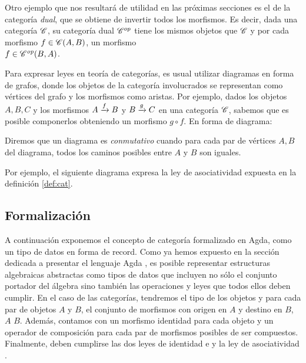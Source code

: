 \begin{example} \label{ex:op}
Otro ejemplo que nos resultará de utilidad en las próximas secciones es el de la categoría {\it dual}, que se obtiene de invertir todos los morfismos. Es decir, dada una categoría $\C$, su categoría dual $\C^{op}$ tiene los mismos objetos que $\C$ y por cada morfismo $f \in \Hom{A}{B}{\C}$, un morfismo\\ $f \in \Hom{B}{A}{\C^{op}}$.
\end{example}

\hspace{1ex}
Para expresar leyes en teoría de categorías, es usual utilizar diagramas en forma de grafos, donde los objetos de la categoría involucrados se representan como vértices del grafo y los morfismos como aristas. Por ejemplo, dados los objetos $A,B,C$ y los morfismos $\flecha{A}{f}{B}$ y $\flecha{B}{g}{C}$ en una categoría $\C$, sabemos que es posible componerlos obteniendo un morfismo $g \circ f$. En forma de diagrama:

  \begin{center}
  \xymatrixcolsep{3pc} \xymatrixrowsep{3pc}
  \centerline{}
  \end{center}

  Diremos que un diagrama es {\it conmutativo} cuando para cada par de vértices $A, B$ del diagrama, todos los caminos posibles entre $A$ y $B$ son iguales.

  Por ejemplo, el siguiente diagrama expresa la ley de asociatividad expuesta en la definición \ref{def:cat}.

  \begin{center}
  \xymatrixcolsep{3pc} \xymatrixrowsep{3pc}
  \centerline{}
  \end{center}

\subsection{Formalización}
A continuación exponemos el concepto de categoría formalizado en Agda, como un tipo de datos en forma de record.  
Como ya hemos expuesto en la sección dedicada a presentar el lenguaje Agda%
, es posible representar estructuras algebraicas abstractas como tipos de datos que incluyen no sólo el conjunto portador del álgebra sino también las operaciones y leyes que todos ellos deben cumplir. En el caso de las categorías, tendremos el tipo de los objetos  y para cada par de objetos $A$ y $B$, el conjunto de morfismos con origen en $A$ y destino en $B$,  $A$ $B$. Además, contamos con un morfismo identidad  para cada objeto y un operador de composición para cada par de morfismos posibles de ser compuestos. Finalmente, deben cumplirse las dos leyes de identidad  e  y la ley de asociatividad .

